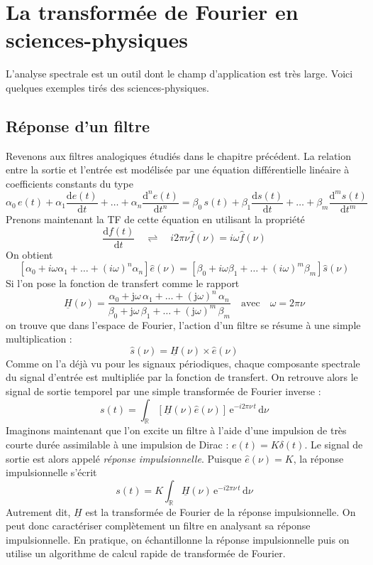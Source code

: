 

\section[La TF en sciences-physiques]{La transformée de Fourier en sciences-physiques} %
\label{sec:la_transformee_de_fourier_en_physique}
L'analyse spectrale est un outil dont le champ d'application est très large. Voici quelques exemples tirés des sciences-physiques.

\subsection{Réponse d'un filtre} %
\label{sub:en_electronique}
Revenons aux filtres analogiques étudiés dans le chapitre précédent. La relation entre la sortie et l'entrée est modélisée par une équation différentielle linéaire à coefficients constants du type
\[
\alpha_0\,e(t)+\alpha_1 \frac{\mathrm{d}e(t)}{\mathrm{d}t}+\ldots+\alpha_n \frac{\mathrm{d}^ne(t)}{\mathrm{d}t^n}=
\beta_0\,s(t)+\beta_1 \frac{\mathrm{d}s(t)}{\mathrm{d}t}+\ldots+\beta_m \frac{\mathrm{d}^m s(t)}{\mathrm{d}t^m}
\]
Prenons maintenant la TF de cette équation en utilisant la propriété
\[
	\frac{\mathrm{d}f(t)}{\mathrm{d}t} \quad\rightleftharpoons\quad  i2\pi\nu\widehat{f}(\nu)=i\omega \widehat{f}(\nu)
\]
On obtient
\[
	\left[\alpha_0+i\omega\alpha_1+\ldots+(i\omega)^n\alpha_n \right]\widehat{e}(\nu)=
	\left[\beta_0+i\omega\beta_1+\ldots+(i\omega)^m\beta_m \right]\widehat{s}(\nu)
\]
Si l'on pose la fonction de transfert comme le rapport
\[
	\underline{H}(\nu)=
	\frac{\alpha_0+\mathrm{j}\omega\, \alpha_1+\ldots+(\mathrm{j}\omega)^n\, \alpha_n}{\beta_0+\mathrm{j}\omega\, \beta_1+\ldots+(\mathrm{j}\omega)^m\, \beta_m}
	\quad\text{avec}\quad
	\omega=2\pi\nu
\]
on trouve que dans l'espace de Fourier, l'action d'un filtre se résume à une simple multiplication :
\[
	\widehat{s}(\nu)=\underline{H}(\nu)\times \widehat{e}(\nu)
\]
Comme on l'a déjà vu pour les signaux périodiques, chaque composante spectrale du signal d'entrée est multipliée par la fonction de transfert. On retrouve alors le signal de sortie temporel par une simple transformée de Fourier inverse :
\[
	s(t)=\int_{\mathbb{R}} \left[\underline{H}(\nu)\widehat{e}(\nu)\right]\, \mathrm{e}^{-i2\pi\nu\,t}\, \mathrm{d}\nu
\]
Imaginons maintenant que l'on excite un filtre à l'aide d'une impulsion de très courte durée assimilable à une impulsion de Dirac : \(e(t)=K\delta(t)\). Le signal de sortie est alors appelé \emph{réponse impulsionnelle}. Puisque \(\widehat{e}(\nu)=K\), la réponse impulsionnelle s'écrit
\[
	s(t)=K\int_{\mathbb{R}} \underline{H}(\nu)\, \mathrm{e}^{-i2\pi\nu\,t}\, \mathrm{d}\nu
\]
Autrement dit, \(\underline{H}\) est la transformée de Fourier de la réponse impulsionnelle.
On peut donc caractériser complètement un filtre en analysant sa réponse impulsionnelle. En pratique, on échantillonne la réponse impulsionnelle puis on utilise un algorithme de calcul rapide de transformée de Fourier.


